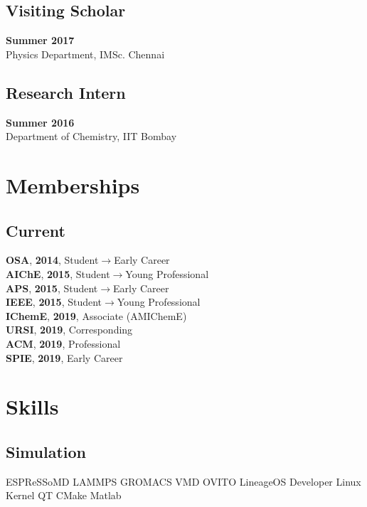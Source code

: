 \documentclass[letterpaper]{deedy-resume} %
\begin{document}
\begin{minipage}[t]{0.36\textwidth}
	\subsection{Visiting Scholar}
	\textbf{Summer 2017}\\ Physics Department, IMSc. Chennai
	\subsection{Research Intern}
	\textbf{Summer 2016}\\ Department of Chemistry, IIT Bombay


	\section{Memberships}
	\subsection{Current}
	\textbf{OSA}, \textbf{2014}, Student$\to$Early Career\\
	\textbf{AIChE}, \textbf{2015}, Student$\to$Young Professional\\
	\textbf{APS}, \textbf{2015}, Student$\to$Early Career\\
	\textbf{IEEE}, \textbf{2015}, Student$\to$Young Professional\\
	\textbf{IChemE}, \textbf{2019}, Associate (AMIChemE)\\
	\textbf{URSI}, \textbf{2019}, Corresponding \\
	\textbf{ACM}, \textbf{2019}, Professional \\
	\textbf{SPIE}, \textbf{2019}, Early Career \\



	\section{Skills}
	\subsection{Simulation}
	ESPReSSoMD \textbullet{} LAMMPS \textbullet{} GROMACS \textbullet{} VMD \textbullet{} OVITO\textbullet{} LineageOS Developer\textbullet{} Linux Kernel\textbullet{} QT\textbullet{} CMake\textbullet{} Matlab\\

\end{minipage}
\end{document}
